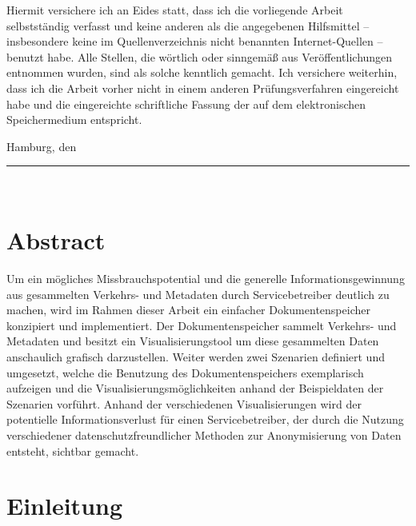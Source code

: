\documentclass[
    fontsize=12pt,
    headings=small,
    parskip=half,           %
    bibliography=totoc,
    numbers=noenddot,       %
    open=any,               %
    ]{scrreprt}
\begin{document}
Hiermit versichere ich an Eides statt, dass ich die vorliegende Arbeit selbstständig verfasst und keine anderen als die angegebenen Hilfsmittel – insbesondere keine im Quellenverzeichnis nicht benannten Internet-Quellen – benutzt habe. Alle Stellen, die wörtlich oder sinngemäß aus Veröffentlichungen entnommen wurden, sind als solche kenntlich gemacht. Ich versichere weiterhin, dass ich die Arbeit vorher nicht in einem anderen Prüfungsverfahren eingereicht habe und die eingereichte schriftliche Fassung der auf dem elektronischen Speichermedium entspricht.

\makeatletter
Hamburg, den {\@date}
\makeatother

\vspace{2cm}
\rule{6cm}{0.25pt}\\
\makeatletter
{\@author} \par
\makeatother

\chapter*{Abstract}
Um ein mögliches Missbrauchspotential und die generelle Informationsgewinnung aus gesammelten Verkehrs- und Metadaten durch Servicebetreiber deutlich zu machen, wird im Rahmen dieser Arbeit ein einfacher Dokumentenspeicher konzipiert und implementiert.
Der Dokumentenspeicher sammelt Verkehrs- und Metadaten und besitzt ein Visualisierungstool um diese gesammelten Daten anschaulich grafisch darzustellen.
Weiter werden zwei Szenarien definiert und umgesetzt, welche die Benutzung des Dokumentenspeichers exemplarisch aufzeigen und die Visualisierungsmöglichkeiten anhand der Beispieldaten der Szenarien vorführt.
Anhand der verschiedenen Visualisierungen wird der potentielle Informationsverlust für einen Servicebetreiber, der durch die Nutzung verschiedener datenschutzfreundlicher Methoden zur Anonymisierung von Daten entsteht, sichtbar gemacht. 

\tableofcontents
\listoffigures
{}

\chapter{Einleitung} \label{Kap:Einleitung}
\end{document}
